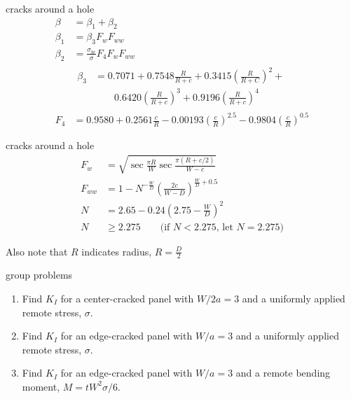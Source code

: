 \documentclass[
  letterpaper,
  ignorenonframetext,
  aspectratio=43,
  handout,
  12pt]{beamer}
\begin{document}
\begin{frame}{cracks around a hole}
\protect\hypertarget{cracks-around-a-hole-5}{}
\[\begin{aligned}
    \beta &= \beta_1 + \beta_2\\
    \beta_1 &= \beta_3 F_w F_{ww}\\
    \beta_2 &= \frac{\sigma_{br}}{\sigma} F_4 F_w F_{ww}\\
    &\begin{aligned}
    \beta_3 &= 0.7071 + 0.7548 \frac{R}{R+c} + 0.3415 \left(\frac{R}{R+C}\right)^2 + \\
    &\qquad 0.6420 \left(\frac{R}{R+c}\right)^3 + 0.9196\left(\frac{R}{R+c}\right)^4
    \end{aligned}\\
    F_4 &= 0.9580 + 0.2561 \frac{c}{R} - 0.00193 \left(\frac{c}{R}\right)^{2.5} - 0.9804 \left(\frac{c}{R}\right)^{0.5}
\end{aligned}\]
\end{frame}

\begin{frame}{cracks around a hole}
\protect\hypertarget{cracks-around-a-hole-6}{}
\[\begin{aligned}
  F_w &= \sqrt{\sec \frac{\pi R}{W} \sec \frac{\pi (R + c/2)}{W-c}}\\
  F_{ww} &= 1 - N^{-\frac{W}{D}} \left(\frac{2c}{W-D}\right)^{\frac{W}{D} + 0.5}\\
  N &= 2.65 - 0.24\left(2.75 - \frac{W}{D}\right)^2\\
  N &\ge 2.275 \qquad \text{(if }N < 2.275\text{, let }N=2.275)
\end{aligned}\]

Also note that \(R\) indicates radius, \(R=\frac{D}{2}\)
\end{frame}

\begin{frame}{group problems}
\protect\hypertarget{group-problems}{}
\begin{enumerate}
\item
  Find \(K_I\) for a center-cracked panel with \(W/2a = 3\) and a
  uniformly applied remote stress, \(\sigma\).
\item
  Find \(K_I\) for an edge-cracked panel with \(W/a = 3\) and a
  uniformly applied remote stress, \(\sigma\).
\item
  Find \(K_I\) for an edge-cracked panel with \(W/a = 3\) and a remote
  bending moment, \(M = tW^2\sigma/6\).
\end{enumerate}
\end{frame}
\end{document}
